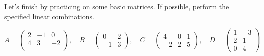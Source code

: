 \documentclass{ximera}
\begin{document}
Let's finish by practicing on some basic matrices. If possible, perform the specified linear combinations.

\[
A = \begin{pmatrix}
2 & -1 & 0 \\
4 & 3 & -2 \\
\end{pmatrix}, \quad
B = \begin{pmatrix}
0 & 2 \\
-1 & 3
\end{pmatrix}, \quad
C = \begin{pmatrix}
4 & 0 & 1 \\
-2 & 2 & 5
\end{pmatrix}, \quad
D = \begin{pmatrix}
1 & -3 \\
2 & 1 \\
0 & 4
\end{pmatrix}
\]
\end{document}

